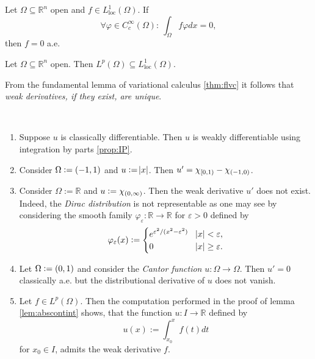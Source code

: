 \begin{theorem}
	\label{thm:flvc}
	Let $\Omega \subseteq \mathbb{R}^n$ open and $f \in L^1_{\mathrm{loc}}(\Omega)$. If
	\begin{equation*}
		\forall \varphi \in C^\infty_c(\Omega) : \> \int_\Omega f \varphi dx = 0,
	\end{equation*}
	\noindent then $f = 0$ a.e.
\end{theorem}

\begin{remark}
	Let $\Omega \subseteq \mathbb{R}^n$ open. Then $L^p(\Omega) \subseteq L^1_{\mathrm{loc}}(\Omega)$.
\end{remark}

\begin{remark}
	From the fundamental lemma of variational calculus \ref{thm:flvc} it follows that \emph{weak derivatives, if they exist, are unique}.
\end{remark}

\begin{examples}[Weak Derivatives]
	~
	\begin{enumerate}[label = \textup{(}\alph*\textup{)},wide = 0pt]
		\item Suppose $u$ is classically differentiable. Then $u$ is weakly differentiable using integration by parts \ref{prop:IP}.
		\item Consider $\Omega := \intoo{-1,1}$ and $u := \abs{x}$. Then $u' = \chi_{\intco{0,1}} -\chi_{\intoo{-1,0}}$.
		\item Consider $\Omega := \mathbb{R}$ and $u := \chi_{\intoo{0,\infty}}$. Then the weak derivative $u'$ does not exist. Indeed, the \emph{Dirac distribution} is not representable as one may see by considering the smooth family $\varphi_\varepsilon : \mathbb{R} \to \mathbb{R}$ for $\varepsilon > 0$ defined by
			\begin{equation*}
				\varphi_\varepsilon(x) := \begin{cases}
					e^{\varepsilon^2/(x^2 - \varepsilon^2)} & \abs{x} < \varepsilon,\\
					0 & \abs{x} \geq \varepsilon.
				\end{cases}
			\end{equation*}
		\item Let $\Omega := \intoo{0,1}$ and consider the \emph{Cantor function} $u : \Omega \to \Omega$. Then $u' = 0$ classically a.e. but the distributional derivative of $u$ does not vanish.
		\item Let $f \in L^p(\Omega)$. Then the computation performed in the proof of lemma \ref{lem:abscontint} shows, that the function $u : I \to \mathbb{R}$ defined by
			\begin{equation*}
				u(x) := \int_{x_0}^x f(t)dt
			\end{equation*}
			\noindent for $x_0 \in I$, admits the weak derivative $f$.
	\end{enumerate}
\end{examples}


